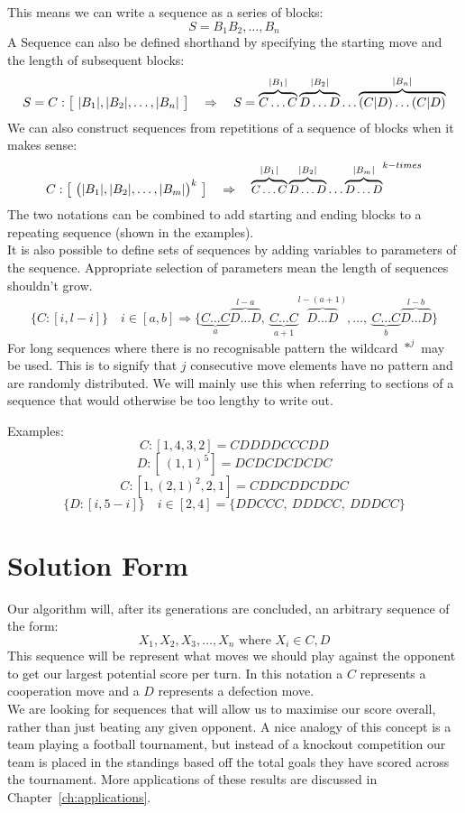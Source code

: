 This means we can write a sequence as a series of blocks:
\[S= B_1B_2,\ldots,B_n\]
A Sequence can also be defined shorthand by specifying the starting move and the length of subsequent blocks: 
\[S = C:\big{[}\ |B_1|,|B_2|,\ldots,|B_n|\ \big{]} \quad \Rightarrow \quad S=\overbrace{C\ldots C}^{|B_1|}\overbrace{D\ldots D}^{|B_2|}\ldots\overbrace{(C|D)\ldots (C|D)}^{|B_n|} \]
We can also construct sequences from repetitions of a sequence of blocks when it makes sense:
\[C:\big{[}\ \big{(}|B_1|,|B_2|,\ldots,|B_m|\big{)}^{k}\ \big{]} \quad \Rightarrow \quad {\small{\overbrace{C\ldots C}^{|B_1|}\overbrace{D\ldots D}^{|B_2|}\ldots\overbrace{D\ldots D}^{|B_m|}}}^{k-times}\]
The two notations can be combined to add starting and ending blocks to a repeating sequence (shown in the examples).\\ 

It is also possible to define sets of sequences by adding variables to parameters of the sequence. Appropriate selection of parameters mean the length of sequences shouldn't grow.
\[ \{C:[i,l-i]\} \quad i\in [a,b] \Rightarrow \{\underbrace{C\ldots C}_{a}\overbrace{D\ldots D}^{l-a},\ \underbrace{C\ldots C}_{a+1}\overbrace{D\ldots D}^{l-(a+1)},\ldots ,\ \underbrace{C\ldots C}_{b}\overbrace{D\ldots D}^{l-b}\} \]
For long sequences where there is no recognisable pattern the wildcard \(*^{j}\) may be used. 
This is to signify that \(j\) consecutive move elements have no pattern and are randomly distributed.
We will mainly use this when referring to sections of a sequence that would otherwise be too lengthy to write out.

Examples:
\[ C:[1,4,3,2] = CDDDDCCCDD \]
\[ D:[\ (1,1)^{5}] = DCDCDCDCDC \]
\[ C:[1,(2,1)^{2},2,1] = CDDCDDCDDC \]
\[ \{D:[i,5-i]\} \quad i\in [2,4] = \{DDCCC,\ DDDCC,\ DDDCC\}\]

\section{Solution Form}\label{sec:solutionForm}
Our algorithm will, after its generations are concluded, an arbitrary sequence of the form:
\[X_1,X_2,X_3,\ldots ,X_n \textrm{ where }  X_i \in {C,D}\] 
This sequence will be represent what moves we should play against the opponent to get our largest potential score per turn.
In this notation a \(C\) represents a cooperation move and a \(D\) represents a defection move.\\

We are looking for sequences that will allow us to maximise our score overall, rather than just beating any given opponent.
A nice analogy of this concept is a team playing a football tournament, but instead of a knockout competition our team is placed in the standings based off the total goals they have scored across the tournament. 
More applications of these results are discussed in Chapter~\ref{ch:applications}.
